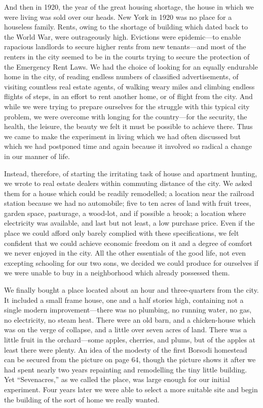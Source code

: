 \documentclass{book}
\begin{document}
And then in 1920, the year of the great housing shortage, the house in which we were living was sold over our heads. New York in 1920 was no place for a houseless family. Rents, owing to the shortage of building which dated back to the World War, were outrageously high. Evictions were epidemic—to enable rapacious landlords to secure higher rents from new tenants—and most of the renters in the city seemed to be in the courts trying to secure the protection of the Emergency Rent Laws. We had the choice of looking for an equally endurable home in the city, of reading endless numbers of classified advertisements, of visiting countless real estate agents, of walking weary miles and climbing endless flights of steps, in an effort to rent another home, or of flight from the city. And while we were trying to prepare ourselves for the struggle with this typical city problem, we were overcome with longing for the country—for the security, the health, the leisure, the beauty we felt it must be possible to achieve there. Thus we came to make the experiment in living which we had often discussed but which we had postponed time and again because it involved so radical a change in our manner of life.

Instead, therefore, of starting the irritating task of house and apartment hunting, we wrote to real estate dealers within commuting distance of the city. We asked them for a house which could be readily remodelled; a location near the railroad station because we had no automobile; five to ten acres of land with fruit trees, garden space, pasturage, a wood-lot, and if possible a brook; a location where electricity was available, and last but not least, a low purchase price. Even if the place we could afford only barely complied with these specifications, we felt confident that we could achieve economic freedom on it and a degree of comfort we never enjoyed in the city. All the other essentials of the good life, not even excepting schooling for our two sons, we decided we could produce for ourselves if we were unable to buy in a neighborhood which already possessed them.

We finally bought a place located about an hour and three-quarters from the city. It included a small frame house, one and a half stories high, containing not a single modern improvement—there was no plumbing, no running water, no gas, no electricity, no steam heat. There were an old barn, and a chicken-house which was on the verge of collapse, and a little over seven acres of land. There was a little fruit in the orchard—some apples, cherries, and plums, but of the apples at least there were plenty. An idea of the modesty of the first Borsodi homestead can be secured from the picture on page 64, though the picture shows it after we had spent nearly two years repainting and remodelling the tiny little building. Yet “Sevenacres,” as we called the place, was large enough for our initial experiment. Four years later we were able to select a more suitable site and begin the building of the sort of home we really wanted.
\end{document}
